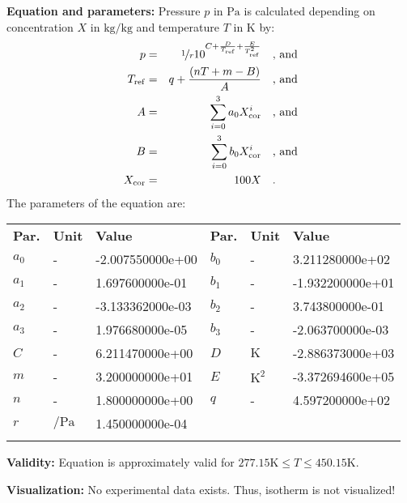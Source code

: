 \textbf{Equation and parameters:}
\newline
%
Pressure $p$ in $\si{\pascal}$ is calculated depending on concentration $X$ in $\si{\kilogram\per\kilogram}$ and  temperature $T$ in $\si{\kelvin}$ by:
%
\begin{equation*}
\begin{split}
p &=& \nicefrac{1}{r} 10 ^ { C + \frac{D}{T_\mathrm{ref}} + \frac{E}{T_\mathrm{ref}^{2}} } & \quad\text{, and} \\
T_\mathrm{ref} &=& q + \frac{\left( n T + m - B \right)}{A}  & \quad\text{, and} \\
A &=& \sum_{i=0}^{3} a_0 X_\mathrm{cor} ^{i}  & \quad\text{, and} \\
B &=& \sum_{i=0}^{3} b_0 X_\mathrm{cor} ^{i}  & \quad\text{, and} \\
X_\mathrm{cor} &=& 100 X  & \quad\text{.} \\
\end{split}
\end{equation*}
%
The parameters of the equation are:
%
\begin{longtable}[l]{lll|lll}
\toprule
\addlinespace
\textbf{Par.} & \textbf{Unit} & \textbf{Value} &	\textbf{Par.} & \textbf{Unit} & \textbf{Value} \\
\addlinespace
\midrule
\endhead

\bottomrule
\endfoot
\bottomrule
\endlastfoot
\addlinespace

$a_0$ & - & -2.007550000e+00 & $b_0$ & - & 3.211280000e+02 \\
$a_1$ & - & 1.697600000e-01 & $b_1$ & - & -1.932200000e+01 \\
$a_2$ & - & -3.133362000e-03 & $b_2$ & - & 3.743800000e-01 \\
$a_3$ & - & 1.976680000e-05 & $b_3$ & - & -2.063700000e-03 \\
$C$ & - & 6.211470000e+00 & $D$ & $\si{\kelvin}$ & -2.886373000e+03 \\
$m$ & - & 3.200000000e+01 & $E$ & $\si{\square\kelvin}$ & -3.372694600e+05 \\
$n$ & - & 1.800000000e+00 & $q$ & - & 4.597200000e+02 \\
$r$ & $\si{\per\pascal}$ & 1.450000000e-04 & & & \\

\addlinespace\end{longtable}

\textbf{Validity:}
\newline
Equation is approximately valid for $277.15 \si{\kelvin} \leq T \leq 450.15 \si{\kelvin}$.
\newline

\textbf{Visualization:}
%
\newline
No experimental data exists. Thus, isotherm is not visualized!
%

\FloatBarrier
\newpage
